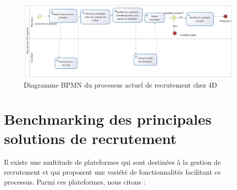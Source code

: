 \begin{figure}[h]
   \centering
   \includegraphics[scale=0.3]{Images/BPMN2.png} 
   \caption{Diagramme BPMN du processus actuel de recrutement chez 4D}
   \label{fig:BPMN1}
\end{figure}





\section{Benchmarking des principales solutions de recrutement}

Il existe une multitude de plateformes qui sont destinées à la gestion de recrutement
et qui proposent une variété de fonctionnalités facilitant ce processus. Parmi ces plateformes, nous citons :


